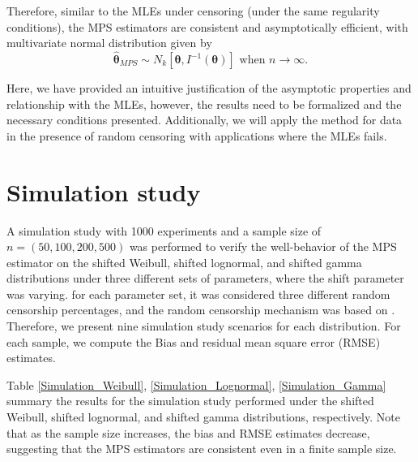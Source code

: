 \documentclass[10pt,a4paper,onecolumn]{article} %
\begin{document}
Therefore, similar to the  MLEs under censoring (under the same regularity conditions), the MPS estimators are consistent and asymptotically efficient, with multivariate normal distribution given by
\begin{equation*}
\hat{\boldsymbol{\theta}}_{MPS}\sim N_k\left[\boldsymbol{\theta},I^{-1}(\boldsymbol{\theta})\right] \mbox{ when } n \to \infty .
\end{equation*}

Here, we have provided an intuitive justification of the asymptotic properties and relationship with the MLEs, however, the results need to be formalized and the necessary conditions presented. Additionally, we will apply the method for data in the presence of random censoring with applications where the MLEs fails. 



\section{Simulation study}
A simulation study with 1000 experiments and a sample size of $n=(50,100,200,500)$ was performed to verify the well-behavior of the MPS estimator on the shifted Weibull, shifted lognormal, and shifted gamma distributions under three different sets of parameters, where the shift parameter was varying. for each parameter set, it was considered three different random censorship percentages, and the random censorship mechanism was based on \cite{Martinez2016}. Therefore, we present nine simulation study scenarios for each distribution. For each sample, we compute the Bias and residual mean square error (RMSE) estimates.

Table \ref{Simulation_Weibull}, \ref{Simulation_Lognormal}, \ref{Simulation_Gamma} summary the results for the simulation study performed under the shifted Weibull, shifted lognormal, and shifted gamma distributions, respectively. Note that as the sample size increases, the bias and RMSE estimates decrease, suggesting that the MPS estimators are consistent even in a finite sample size.
\end{document}
